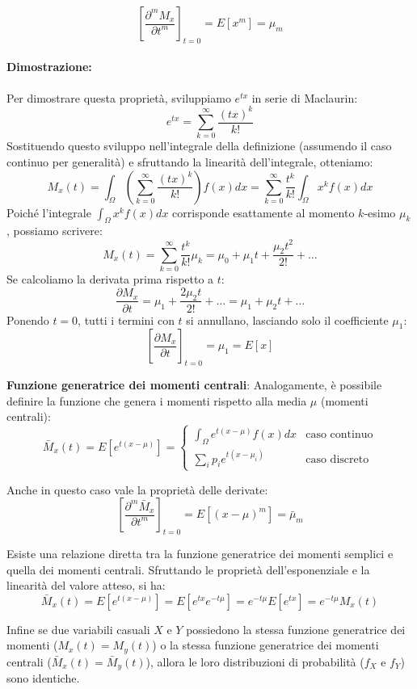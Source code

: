 \documentclass[openany,a4paper,12pt]{book}
\theoremstyle{remark}
\begin{document}
\[
\left[ \frac{\partial ^m M_x}{\partial t^m} \right]_{t=0} = E[x^m] = \mu_m
\]

\paragraph{Dimostrazione:}
Per dimostrare questa proprietà, sviluppiamo $e^{tx}$ in serie di Maclaurin:
\[ 
e^{tx} = \sum_{k=0}^{\infty} \frac{(tx)^k}{k!} 
\]
Sostituendo questo sviluppo nell'integrale della definizione (assumendo il caso continuo per generalità) e sfruttando la linearità dell'integrale, otteniamo:
\[
M_x(t) = \int_\Omega \left( \sum_{k=0}^{\infty} \frac{(tx)^k}{k!} \right) f(x) dx = \sum_{k=0}^{\infty} \frac{t^k}{k!} \int_\Omega x^k f(x) dx 
\]
Poiché l'integrale $\int_\Omega x^k f(x) dx$ corrisponde esattamente al momento $k$-esimo $\mu_k$, possiamo scrivere:
\[
M_x(t) = \sum_{k=0}^{\infty} \frac{t^k}{k!} \mu_k = \mu_0 + \mu_1 t + \frac{\mu_2 t^2}{2!} + \ldots
\]
Se calcoliamo la derivata prima rispetto a $t$:
\[ \frac{\partial M_x}{\partial t} = \mu_1 + \frac{2\mu_2 t}{2!} + \ldots = \mu_1 + \mu_2 t + \ldots \]
Ponendo $t=0$, tutti i termini con $t$ si annullano, lasciando solo il coefficiente $\mu_1$:
\[ \left[ \frac{\partial M_x}{\partial t} \right]_{t=0} = \mu_1 = E[x] \]

\begin{definizione}
    \textbf{Funzione generatrice dei momenti centrali}:
    Analogamente, è possibile definire la funzione che genera i momenti rispetto alla media $\mu$ (momenti centrali):
        \[
    \bar{M}_x(t) = E[e^{t(x-\mu)}] = 
    \begin{cases} 
    \displaystyle \int_\Omega e^{t(x-\mu)}f(x) dx & \text{caso continuo} \\[1em]
    \displaystyle \sum_i p_i e^{t(x-\mu_i)} & \text{caso discreto}
    \end{cases}
    \]
\end{definizione}

Anche in questo caso vale la proprietà delle derivate:
\[
\left[ \frac{\partial ^m \bar{M}_x}{\partial t^m}\right]_{t=0} = E[(x-\mu)^m] = \bar{\mu}_m 
\]


Esiste una relazione diretta tra la funzione generatrice dei momenti semplici e quella dei momenti centrali. Sfruttando le proprietà dell'esponenziale e la linearità del valore atteso, si ha:
\[
\bar{M}_x(t) = E[e^{t(x-\mu)}] = E[e^{tx}e^{-t\mu}] = e^{-t\mu}E[e^{tx}] = e^{-t\mu}M_x(t)
\]


Infine se due variabili casuali $X$ e $Y$ possiedono la stessa funzione generatrice dei momenti ($M_x(t)=M_y(t)$) o la stessa funzione generatrice dei momenti centrali ($\bar{M}_x(t)=\bar{M}_y(t)$), allora le loro distribuzioni di probabilità ($f_X$ e $f_Y$) sono identiche.
\end{document}
